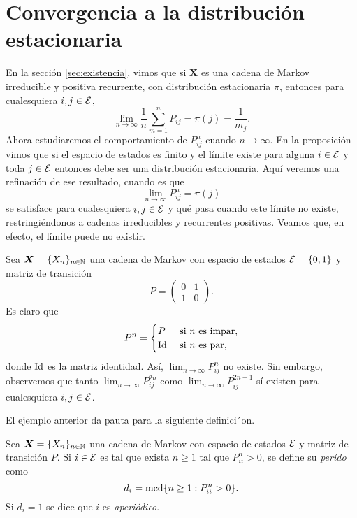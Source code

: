 \section{Convergencia a la distribución estacionaria}

\noindent En la sección \ref{sec:existencia}, vimos que si $\bm X$ es una cadena de Markov irreducible y positiva recurrente, con distribución estacionaria $\pi$, entonces para cualesquiera $i, j \in \mathcal{E}$,
\[
    \lim_{n \to \infty} \frac 1 n \sum_{m = 1}^n P_{ij} = \pi(j) = \frac 1 {m_j}.
\]
Ahora estudiaremos el comportamiento de $P_{ij}^n$ cuando $n \to \infty$. En la proposición vimos que si el espacio de estados es finito y el límite existe para alguna $i \in \mathcal{E}$ y toda $j \in \mathcal{E}$ entonces debe ser una distribución estacionaria. Aquí veremos una refinación de ese resultado, cuando es que
\[
    \lim_{n \to \infty} P_{ij}^n = \pi(j)
\]
se satisface para cualesquiera $i, j \in \mathcal{E}$ y qué pasa cuando este límite no existe, restringiéndonos a cadenas irreducibles y recurrentes positivas. Veamos que, en efecto, el límite puede no existir.

\begin{example} \label{ej:vaquerito}
    Sea $\bm X = \{X_n\}_{n \in \mathbb{N}}$ una cadena de Markov con espacio de estados $\mathcal{E} = \{0,1\}$ y matriz de transición 
    \[
        P = \begin{pmatrix}
            0 & 1 \\ 1 & 0
        \end{pmatrix}.
    \]
    Es claro que 
    \[
        P^n = \begin{cases}
            P & \text{ si } n \text{ es impar}, \\
            \operatorname{Id} & \text{ si } n \text{ es par},
        \end{cases}    
    \] donde $\operatorname{Id}$ es la matriz identidad. Así, $\lim_{n \to \infty} P_{ij}^n$ no existe. Sin embargo, observemos que tanto $\lim_{n \to \infty} P_{ij}^{2n}$ como $\lim_{n \to \infty} P_{ij}^{2n+1}$ sí existen para cualesquiera $i, j \in \mathcal{E}$. 
\end{example}

El ejemplo anterior da pauta para la siguiente definici´on.

\begin{definition}
    Sea $\bm X = \{X_n\}_{n \in \mathbb{N}}$ una cadena de Markov con espacio de estados $\mathcal{E}$ y matriz de transición $P$. Si $i \in \mathcal{E}$ es tal que exista $n \geq 1$ tal que $P_{ii}^n > 0$, se define su \emph{perído} como
    \[
        d_i = \operatorname{mcd} \{n \geq 1 : P_{ii}^n > 0\}.
    \]
    Si $d_i = 1$ se dice que $i$ es \emph{aperiódico}.
\end{definition}


